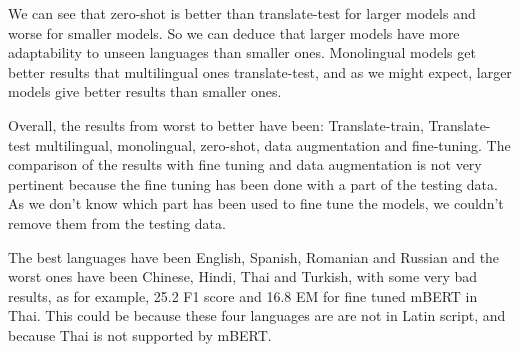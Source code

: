 \documentclass[11pt]{article}
\begin{document}
We can see that zero-shot is better than translate-test for larger models and worse for smaller models. So we can deduce that larger models have more adaptability to unseen languages than smaller ones. Monolingual models get better results that multilingual ones translate-test, and as we might expect, larger models give better results than smaller ones.

Overall, the results from worst to better have been: Translate-train, Translate-test multilingual, monolingual, zero-shot, data augmentation and fine-tuning. The comparison of the results with fine tuning and data augmentation is not very pertinent because the fine tuning has been done with a part of the testing data. As we don't know which part has been used to fine tune the models, we couldn't remove them from the testing data.

The best languages have been English, Spanish, Romanian and Russian and the worst ones have been Chinese, Hindi, Thai and Turkish, with some very bad results, as for example, 25.2 F1 score and 16.8 EM for fine tuned mBERT in Thai. This could be because these four languages are are not in Latin script, and because Thai is not supported by mBERT.
\end{document}
